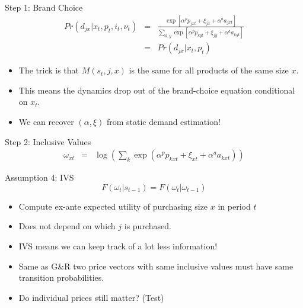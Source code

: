 \documentclass[xcolor=pdftex,dvipsnames,table,mathserif,aspectratio=169]{beamer}
\begin{document}
\begin{frame}{Step 1: Brand Choice}
\begin{eqnarray*}
Pr(d_{jx} | x_t, p_t,i_t,\nu_t) &=& \frac{\exp[\alpha^p p_{jxt} + \xi_{jx} + \alpha^a a_{jxt}]}{\sum_{k,y} \exp[\alpha^p p_{kyt} + \xi_{jy} + \alpha^a a_{kyt}  ] }\\
&=&Pr(d_{jx} | x_t, p_t)
\end{eqnarray*}
\begin{itemize}
\item The trick is that $M(s_t,j,x)$ is the same for all products of the same size $x$.
\item This means the dynamics drop out of the brand-choice equation conditional on $x_t$.
\item We can recover $(\alpha, \xi)$ from static demand estimation!
\end{itemize}
\end{frame}

\begin{frame}{Step 2: Inclusive Values}
\begin{eqnarray*}
\omega_{xt} &=& \log \left( \sum_k \exp(\alpha^p p_{kxt} + \xi_{xt} + \alpha^a a_{kxt}) \right)
\end{eqnarray*}
\vspace{-0.5cm}
\begin{block}{Assumption 4: IVS}
$$F(\omega_t | s_{t-1}) = F(\omega_t | \omega_{t-1})$$
\end{block}
\begin{itemize}
\item Compute ex-ante expected utility of purchasing size $x$ in period $t$
\item Does not depend on which $j$ is purchased.
\item IVS means we can keep track of a lot less information!
\item Same as G\&R two price vectors with same inclusive values must have same transition probabilities.
\item Do individual prices still matter? (Test)
\end{itemize}
\end{frame}
\end{document}
